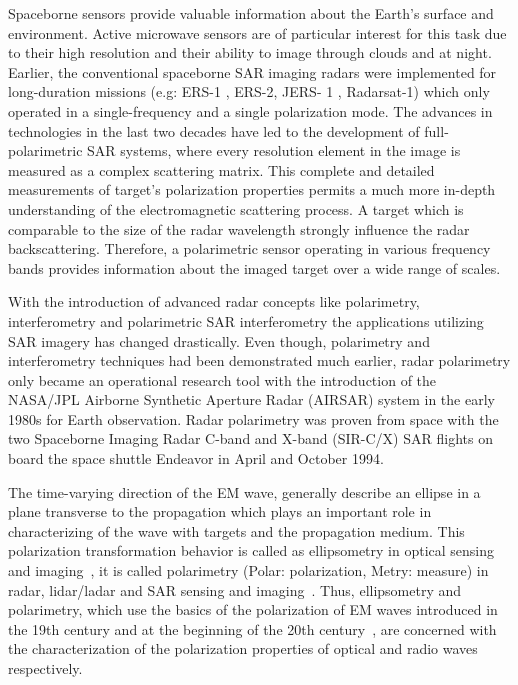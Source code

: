 Spaceborne sensors provide valuable information about the Earth's surface and environment. Active microwave sensors are of particular interest for this task due to their high resolution and their ability to image through clouds and at night. Earlier, the conventional spaceborne SAR imaging radars were implemented for long-duration missions (e.g: ERS-1 , ERS-2, JERS- 1 , Radarsat-1) which only operated in a single-frequency and a single polarization mode. The advances in technologies in the last two decades have led to the development of full-polarimetric SAR systems, where every resolution element in the image is measured as a complex scattering matrix. This complete and detailed measurements of target's polarization properties permits a much more in-depth understanding of the electromagnetic scattering process. A target which is comparable to the size of the radar wavelength strongly influence the radar backscattering. Therefore, a polarimetric sensor operating in various frequency bands provides information about the imaged target over a wide range of scales.

With the introduction of advanced radar concepts like polarimetry, interferometry and polarimetric SAR interferometry the applications utilizing SAR imagery has changed drastically. Even though, polarimetry and interferometry techniques had been demonstrated much earlier, radar polarimetry only became an operational research tool with the introduction of the NASA/JPL Airborne Synthetic Aperture Radar (AIRSAR) system in the early 1980s for Earth observation. Radar polarimetry was proven from space with the two Spaceborne Imaging Radar C-band and X-band (SIR-C/X) SAR flights on board the space shuttle Endeavor in April and October 1994. 

The time-varying direction of the EM wave, generally describe an ellipse in a plane transverse to the propagation which plays an important role in characterizing of the wave with targets and the propagation medium. This polarization transformation behavior is called as ellipsometry in optical sensing and imaging~\citep{azzam1977ellipsometry,born1970foundations,jones1941new,wolf1954optics}, it is called polarimetry (Polar: polarization, Metry: measure) in radar, lidar/ladar and SAR sensing and imaging~\citep{kennaugh1952effects,deschamps1949geometrical,rumsey1951techniques,graves1956radar,huynen1970,van1989unsupervised,zebker1987imaging,boerner1997polarimetry}. Thus, ellipsometry and polarimetry, which use the basics of the polarization of EM waves introduced in the 19th century and at the beginning of the 20th century~\citep{stokes1851composition,wiener1930generalized,born1970foundations}, are concerned with the characterization of the polarization properties of optical and radio waves respectively. 

